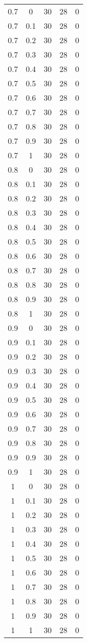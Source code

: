 \begin{longtable}{|c|c|c|c|c|}
	0.7& 0& 30& 28& 0\\
	0.7& 0.1& 30& 28& 0\\
	0.7& 0.2& 30& 28& 0\\
	0.7& 0.3& 30& 28& 0\\
	0.7& 0.4& 30& 28& 0\\
	0.7& 0.5& 30& 28& 0\\
	0.7& 0.6& 30& 28& 0\\
	0.7& 0.7& 30& 28& 0\\
	0.7& 0.8& 30& 28& 0\\
	0.7& 0.9& 30& 28& 0\\
	0.7& 1& 30& 28& 0\\
	\hline
	
	0.8& 0& 30& 28& 0\\
	0.8& 0.1& 30& 28& 0\\
	0.8& 0.2& 30& 28& 0\\
	0.8& 0.3& 30& 28& 0\\
	0.8& 0.4& 30& 28& 0\\
	0.8& 0.5& 30& 28& 0\\
	0.8& 0.6& 30& 28& 0\\
	0.8& 0.7& 30& 28& 0\\
	0.8& 0.8& 30& 28& 0\\
	0.8& 0.9& 30& 28& 0\\
	0.8& 1& 30& 28& 0\\
	\hline
	
	0.9& 0& 30& 28& 0\\
	0.9& 0.1& 30& 28& 0\\
	0.9& 0.2& 30& 28& 0\\
	0.9& 0.3& 30& 28& 0\\
	0.9& 0.4& 30& 28& 0\\
	0.9& 0.5& 30& 28& 0\\
	0.9& 0.6& 30& 28& 0\\
	0.9& 0.7& 30& 28& 0\\
	0.9& 0.8& 30& 28& 0\\
	0.9& 0.9& 30& 28& 0\\
	0.9& 1& 30& 28& 0\\
	\hline
	
	1& 0& 30& 28& 0\\
	1& 0.1& 30& 28& 0\\
	1& 0.2& 30& 28& 0\\
	1& 0.3& 30& 28& 0\\
	1& 0.4& 30& 28& 0\\
	1& 0.5& 30& 28& 0\\
	1& 0.6& 30& 28& 0\\
	1& 0.7& 30& 28& 0\\
	1& 0.8& 30& 28& 0\\
	1& 0.9& 30& 28& 0\\
	1& 1& 30& 28& 0\\
	
\end{longtable}

